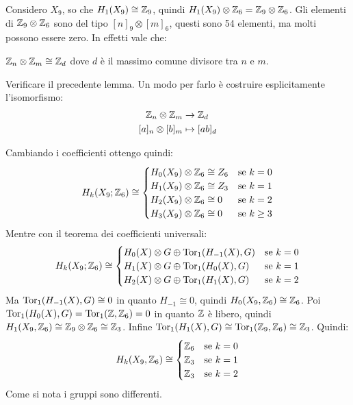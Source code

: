\begin{example}
  Considero $ X_9 $, so che $ H_1(X_9) \cong \mathbb{Z}_9 $, quindi $ H_1(X_9) \otimes \mathbb{Z}_6 = \mathbb{Z}_9 \otimes \mathbb{Z}_6 $.
  Gli elementi di $ \mathbb{Z}_9 \otimes \mathbb{Z}_6 $ sono del tipo $ [n]_9 \otimes [m]_6 $, questi sono 54 elementi,
  ma molti possono essere zero. In effetti vale che:
  \begin{lemma}
    $ \mathbb{Z}_n \otimes \mathbb{Z}_m \cong \mathbb{Z}_d $ dove $ d $ è il massimo comune divisore tra $ n $ e $ m $.
  \end{lemma}
  \begin{exercise}
    Verificare il precedente lemma. Un modo per farlo è costruire esplicitamente
    l'isomorfismo:
    \begin{align*}
      \mathbb{Z}_n \otimes \mathbb{Z}_m & \to \mathbb{Z}_d \\
      [a]_n \otimes [b]_m & \mapsto [ab]_d
    \end{align*}
  \end{exercise}
  Cambiando i coefficienti ottengo quindi:
  \[
    H_k(X_9; \mathbb{Z}_6) \cong
    \begin{cases}
      H_0(X_9) \otimes \mathbb{Z}_6 \cong Z_6 & \text{se } k = 0 \\
      H_1(X_9) \otimes \mathbb{Z}_6 \cong Z_3 & \text{se } k = 1 \\
      H_2(X_9) \otimes \mathbb{Z}_6 \cong 0 & \text{se } k = 2 \\
      H_3(X_9) \otimes \mathbb{Z}_6 \cong 0 & \text{se } k \geq 3
    \end{cases}
  \]
  Mentre con il teorema dei coefficienti universali:
  \[
    H_k(X_9; \mathbb{Z}_6) \cong
    \begin{cases}
      H_0(X) \otimes G \oplus \mathrm{Tor_1}( H_{-1}(X),G) & \text{se } k = 0 \\
      H_1(X) \otimes G \oplus \mathrm{Tor_1}( H_0(X),G) & \text{se } k = 1 \\
      H_2(X) \otimes G \oplus \mathrm{Tor_1}( H_1(X),G) & \text{se } k = 2
    \end{cases}
  \]
  Ma $ \mathrm{Tor_1}( H_{-1}(X), G) \cong 0 $ in quanto $ H_{-1} \cong 0 $, quindi
  $ H_0(X_9, \mathbb{Z}_6) \cong \mathbb{Z}_6 $. Poi $ \mathrm{Tor_1}( H_0(X), G) = \mathrm{Tor_1}( \mathbb{Z}, \mathbb{Z}_6) = 0 $ in quanto
  $ \mathbb{Z} $ è libero, quindi $ H_1(X_9, \mathbb{Z}_6) \cong \mathbb{Z}_9 \otimes \mathbb{Z}_6 \cong \mathbb{Z}_3 $. Infine
  $ \mathrm{Tor_1}( H_1(X), G) \cong \mathrm{Tor_1}( \mathbb{Z}_9, \mathbb{Z}_6) \cong \mathbb{Z}_3 $. Quindi:
  \[
    H_k(X_9, \mathbb{Z}_6) \cong
    \begin{cases}
      \mathbb{Z}_6 & \text{se } k = 0 \\
      \mathbb{Z}_3 & \text{se } k = 1 \\
      \mathbb{Z}_3 & \text{se } k = 2
    \end{cases}
  \]
  Come si nota i gruppi sono differenti.
\end{example}

